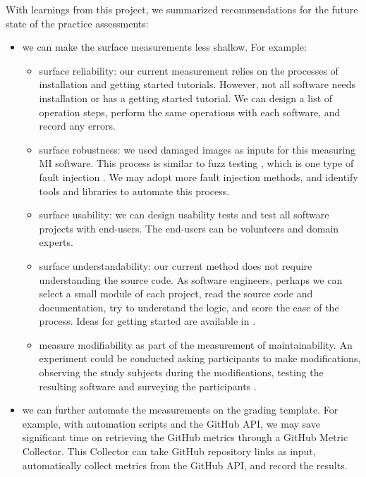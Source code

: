 \documentclass[final, 3p, times, authoryear]{elsarticle}
\begin{document}
With learnings from this project, we summarized recommendations for the future
state of the practice assessments:
\begin{itemize}
    \item we can make the surface measurements less shallow. For example:
    \begin{itemize}
        \item surface reliability: our current measurement relies on
        the processes of installation and getting started tutorials. However,
        not all software needs installation or has a getting started tutorial.
        We can design a list of operation steps, perform the same operations
        with each software, and record any errors.
        \item surface robustness: we used damaged images as inputs for
        this measuring MI software. This process is similar to fuzz testing
        \citep{enwiki:1039424308}, which is one type of fault injection
        \citep{enwiki:1039005082}. We may adopt more fault injection methods, and
        identify tools and libraries to automate this process.
        \item surface usability: we can design usability tests and test
        all software projects with end-users. The end-users can be volunteers
        and domain experts.
        \item surface understandability: our current method does not
        require understanding the source code. As software engineers, perhaps we
        can select a small module of each project, read the source code and
        documentation, try to understand the logic, and score the ease of the
        process.  Ideas for getting started are available in \citet{SmithEtAl2021}.
        \item measure modifiability as part of the measurement of
        maintainability.  An experiment could be conducted asking participants
        to make modifications, observing the study subjects during the
        modifications, testing the resulting software and surveying the
        participants \citep{SmithEtAl2021}.
    \end{itemize}
	\item we can further automate the measurements on the grading template. For
	example, with automation scripts and the GitHub API, we may save significant
	time on retrieving the GitHub metrics through a GitHub Metric Collector.
	This Collector can take GitHub repository links as input, automatically
	collect metrics from the GitHub API, and record the results.

\end{itemize}
\end{document}
